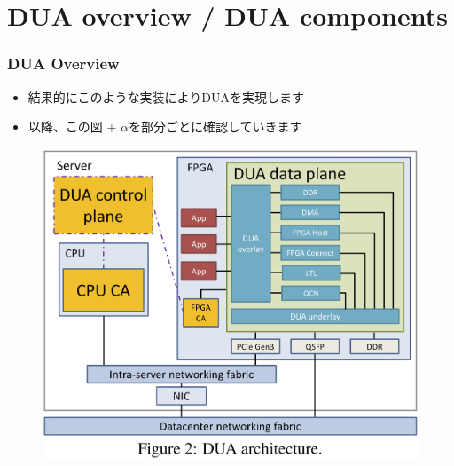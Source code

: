 \documentclass[dvipdfmx,9pt,notheorems]{beamer}
\theoremstyle{definition}
\begin{document}
\section{DUA overview / DUA components}
\begin{frame}\frametitle{DUA Overview}
	\begin{itemize}
		\item 結果的にこのような実装によりDUAを実現します
		\item 以降、この図 + $\alpha$を部分ごとに確認していきます
	\end{itemize}
  \begin{figure}[htb]
		\includegraphics[scale=0.6]{fig/figure2.png}
  \end{figure}
\pnote{
}
\end{frame}

\end{document}
